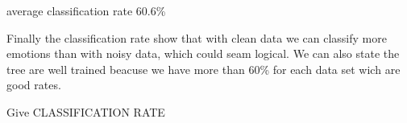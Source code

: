 average classification rate
60.6\%


Finally the classification rate show that with clean data we can classify more emotions than with noisy data, which could seam logical. 
We can also state the tree are well trained beacuse we have more than 60\% for each data set wich are good rates. 



Give CLASSIFICATION RATE
